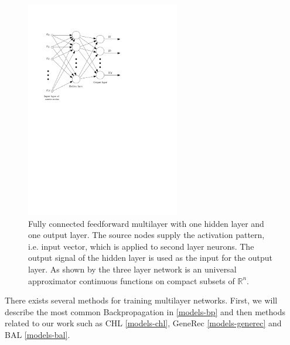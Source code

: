\begin{figure}[h]
  \centering
  \includegraphics[width=0.6\textwidth]{img/multilayer.pdf}    
  \caption{Fully connected feedforward multilayer with one hidden layer and one output layer. The source nodes supply the activation pattern, i.e. input vector, which is applied to second layer neurons. The output signal of the hidden layer is used as the input for the output layer. As shown by \citet{cybenko1989approximation} the three layer network is an universal approximator continuous functions on compact subsets of $\mathbb{R}^n$.} 
  \label{fig:multilayer}
\end{figure}

There exists several methods for training multilayer networks. First, we will describe the most common Backpropagation in \ref{models-bp} and then methods related to our work such as CHL \ref{models-chl}, GeneRec \ref{models-generec} and BAL \ref{models-bal}. 
